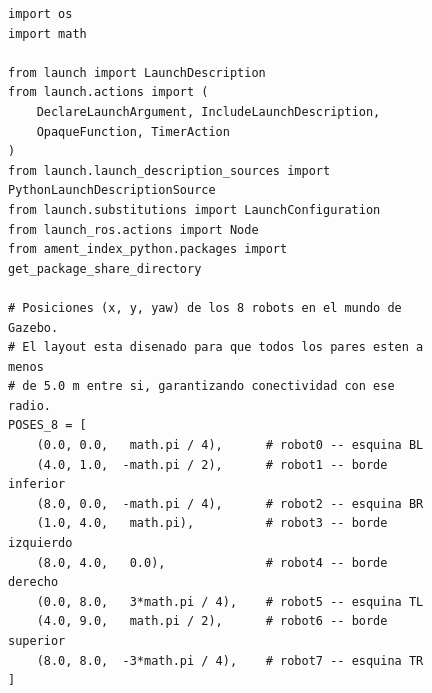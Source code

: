 {\renewcommand{\lstlistingname}{Script}
\begin{figure}[t]
\centering
\begin{lstlisting}[style=python,
    caption={consenso\_prom.launch.py -- Parte 1: imports y poses iniciales.},
    label={lst:consenso_part1}]
import os
import math

from launch import LaunchDescription
from launch.actions import (
    DeclareLaunchArgument, IncludeLaunchDescription,
    OpaqueFunction, TimerAction
)
from launch.launch_description_sources import PythonLaunchDescriptionSource
from launch.substitutions import LaunchConfiguration
from launch_ros.actions import Node
from ament_index_python.packages import get_package_share_directory

# Posiciones (x, y, yaw) de los 8 robots en el mundo de Gazebo.
# El layout esta disenado para que todos los pares esten a menos
# de 5.0 m entre si, garantizando conectividad con ese radio.
POSES_8 = [
    (0.0, 0.0,   math.pi / 4),      # robot0 -- esquina BL
    (4.0, 1.0,  -math.pi / 2),      # robot1 -- borde inferior
    (8.0, 0.0,  -math.pi / 4),      # robot2 -- esquina BR
    (1.0, 4.0,   math.pi),          # robot3 -- borde izquierdo
    (8.0, 4.0,   0.0),              # robot4 -- borde derecho
    (0.0, 8.0,   3*math.pi / 4),    # robot5 -- esquina TL
    (4.0, 9.0,   math.pi / 2),      # robot6 -- borde superior
    (8.0, 8.0,  -3*math.pi / 4),    # robot7 -- esquina TR
]
\end{lstlisting}
\end{figure}
}
